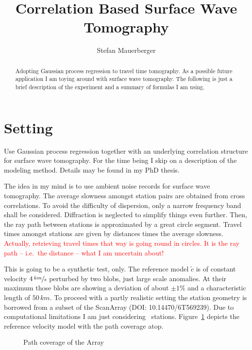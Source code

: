 \documentclass[11pt]{article}
\title{Correlation Based Surface Wave Tomography}
\author{Stefan Mauerberger}
\newcommand\worries[1]{\textcolor{red}{#1}}
\begin{document}
\maketitle
\begin{abstract}
    Adopting Gaussian process regression to travel time tomography.
    As a possible future application I am toying around with surface wave tomography.
    The following is just a brief description of the experiment and a summary of formulas I am using.
\end{abstract}

\section{Setting}


Use Gaussian process regression together with an underlying correlation structure for surface wave tomography.
For the time being I skip on a description of the modeling method.
Details may be found in my PhD thesis.

The idea in my mind is to use ambient noise records for surface wave tomography.
The average slowness amongst station pairs are obtained from cross correlations.
To avoid the difficulty of dispersion, only a narrow frequency band shall be considered.
Diffraction is neglected to simplify things even further.
Then, the ray path between stations is approximated by a great circle segment.
Travel times amongst stations are given by distances times the average slowness.
\worries{Actually, retrieving travel times that way is going round in circles.
It is the ray path -- i.e.~the distance -- what I am uncertain about!}

This is going to be a synthetic test, only.
The reference model $\tilde c$ is of constant velocity $4\,\sfrac{km}s$ perturbed by two blobs, just large scale anomalies.
At their maximum those blobs are showing a deviation of about $\pm 1\%$ and a characteristic length of $50\,km$.
To proceed with a partly realistic setting the station geometry is borrowed from a subset of the ScanArray (DOI: 10.14470/6T569239).
Due to computational limitations I am just considering \SFWnobs\ stations.
Figure~\ref{fig:path_coverage} depicts the reference velocity model with the path coverage atop.

\begin{figure}
    \centering
    
    \caption{Path coverage of the Array}
    \label{fig:path_coverage}
\end{figure}
\end{document}
